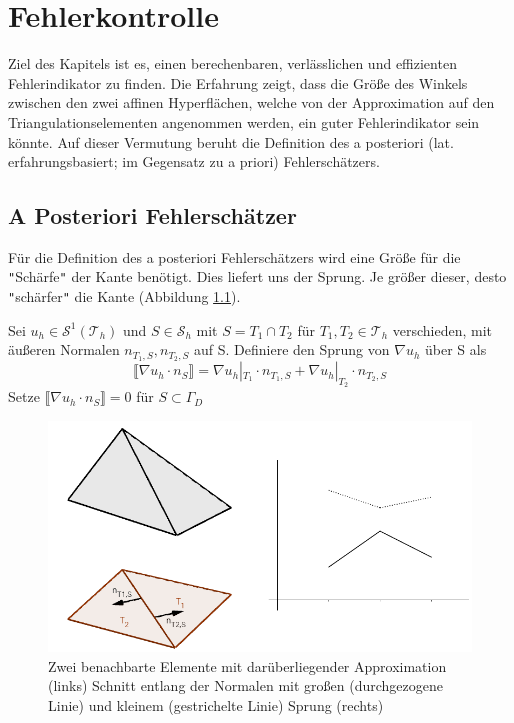 \chapter{Fehlerkontrolle}
Ziel des Kapitels ist es, einen berechenbaren, verlässlichen und effizienten Fehlerindikator zu finden. Die Erfahrung zeigt, dass die Größe des Winkels zwischen den zwei affinen Hyperflächen, welche von der Approximation auf den Triangulationselementen angenommen werden, ein guter Fehlerindikator sein könnte. Auf dieser Vermutung beruht die Definition des a posteriori (lat. erfahrungsbasiert; im Gegensatz zu a priori) Fehlerschätzers. 

\section{A Posteriori Fehlerschätzer}
Für die Definition des a posteriori  Fehlerschätzers wird eine Größe für die \verb|"|Schärfe\verb|"| der Kante benötigt. Dies liefert uns der Sprung. Je größer dieser, desto \verb|"|schärfer\verb|"| die Kante (Abbildung \ref{sprung}). 
\begin{definition}[Sprung]
	Sei $u_h\in\mathscr{S}^1(\mathscr{T}_h)$ und $S\in\mathscr{S}_h$ mit $S=T_1 \cap T_2$ für $T_1,T_2 \in \mathscr{T}_h$ verschieden, mit äußeren Normalen $n_{T_1,S},n_{T_2,S}$ auf S. Definiere den Sprung von $\nabla u_h$ über S als
	\[
	\llbracket \nabla u_h \cdot n_S\rrbracket = \nabla u_h|_{T_1} \cdot n_{T_1,S} + \nabla u_h|_{T_2} \cdot n_{T_2,S}
	\]
	Setze $\llbracket \nabla u_h \cdot n_S\rrbracket = 0$ für $S\subset \Gamma_D$
\end{definition} 

\begin{figure}[!htbp]
	\begin{center}
		\includegraphics[width=12cm]{pics/Sprung.png}
	\end{center}
	\caption{\label{sprung}Zwei benachbarte Elemente mit darüberliegender Approximation (links) Schnitt entlang der Normalen mit großen (durchgezogene Linie) und kleinem (gestrichelte Linie) Sprung (rechts)}
\end{figure}

